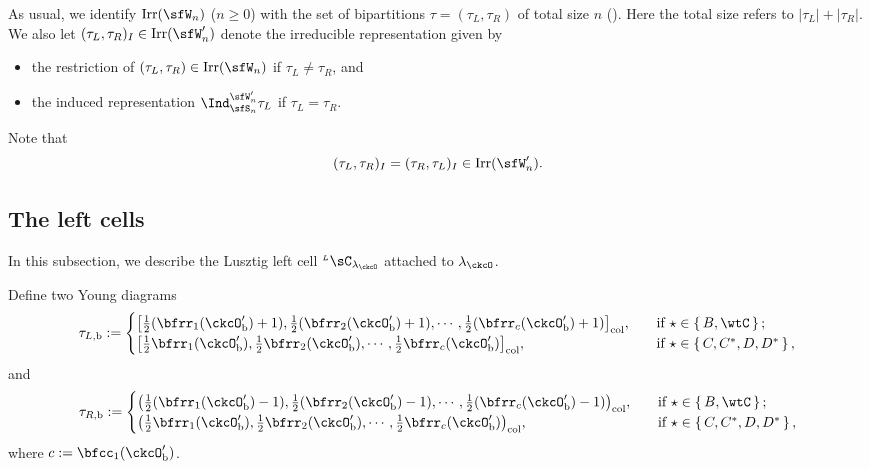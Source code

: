 \documentclass[12pt,a4paper]{amsart}
\def\abs#1{\left|{#1}\right|}
\numberwithin{equation}{section}
\theoremstyle{remark}
\def\half{{\tfrac{1}{2}}}
\def\Irr{\mathrm{Irr}}
\def\LC{{}^{\scriptscriptstyle L}\sC}
\begin{document}
 As usual, we identify $\Irr(\sfW_{n})$ ($n\geq 0$) with the set of bipartitions $\tau =(\tau_{L},\tau_{R})$ of total size $n$ (\cite[Section 11.4]{Carter}). Here the total size refers to
$\abs{\tau_{L}}+\abs{\tau_{R}}$.
We also let $(\tau_{L},\tau_{R})_{I}\in \Irr(\sfW'_n)$ denote the  irreducible representation  given by
  \begin{itemize}
    \item the restriction of $(\tau_{L},\tau_{R})\in \Irr(\sfW_{n})$  if
    $\tau_{L}\neq \tau_{R}$, and
    \item
    the induced representation
    $\Ind_{\sfS_{n}}^{\sfW'_{n}} \tau_{L}$ if $\tau_{L}=\tau_{R}$.
  \end{itemize}
  Note that
  \[
    (\tau_{L},\tau_{R})_{I}=(\tau_{R},\tau_{L})_{I}\in \Irr(\sfW'_{n}).
  \]



  \subsection{The left cells}
  \label{sec:LCBCD}
  In this subsection, we describe the Lusztig left cell $\LC_{\lambda_{\ckcO}}$
  attached to $\lambda_{\ckcO}$. 
 

Define two Young diagrams
 \begin{equation}\label{eq:taub}
    \begin{split}
      \tau_{L,\mathrm b} := \begin{cases}
        \big[\half(\bfrr_{1}(\ckcO'_{\mathrm b})+1), \half(\bfrr_{2}(\ckcO'_{\mathrm b})+1), \cdots, \half(\bfrr_{c}(\ckcO'_{\mathrm b})+1)\big]_{\mathrm{col}},
               &\quad \text{if } \star \in \set{B,\wtC}; \\%
         \big[\half\bfrr_{1}(\ckcO'_{\mathrm b}), \half\bfrr_{2}(\ckcO'_{\mathrm b}),\cdots, \half\bfrr_{c}(\ckcO'_{\mathrm b})\big]_{\mathrm{col}},
        &\quad  \text{if } \star \in \set{C,C^{*}, D,D^{*}},\\
      \end{cases}
    \end{split}
  \end{equation}
  and
   \begin{equation}\label{eq:taub2}
    \begin{split}
      \tau_{R,\mathrm b} := \begin{cases}
        \big(\half(\bfrr_{1}(\ckcO'_{\mathrm b})-1), \half(\bfrr_{2}(\ckcO'_{\mathrm b})-1), \cdots, \half(\bfrr_{c}(\ckcO'_{\mathrm b})-1)\big)_{\mathrm{col}},
               &\quad \text{if } \star \in \set{B,\wtC}; \\%
         \big(\half\bfrr_{1}(\ckcO'_{\mathrm b}), \half\bfrr_{2}(\ckcO'_{\mathrm b}),\cdots, \half\bfrr_{c}(\ckcO'_{\mathrm b})\big)_{\mathrm{col}},
        &\quad  \text{if } \star \in \set{C,C^{*}, D,D^{*}},\\
      \end{cases}
    \end{split}
  \end{equation}
 where $c:= \bfcc_{1}(\ckcO'_{\mathrm b})$.
\end{document}
